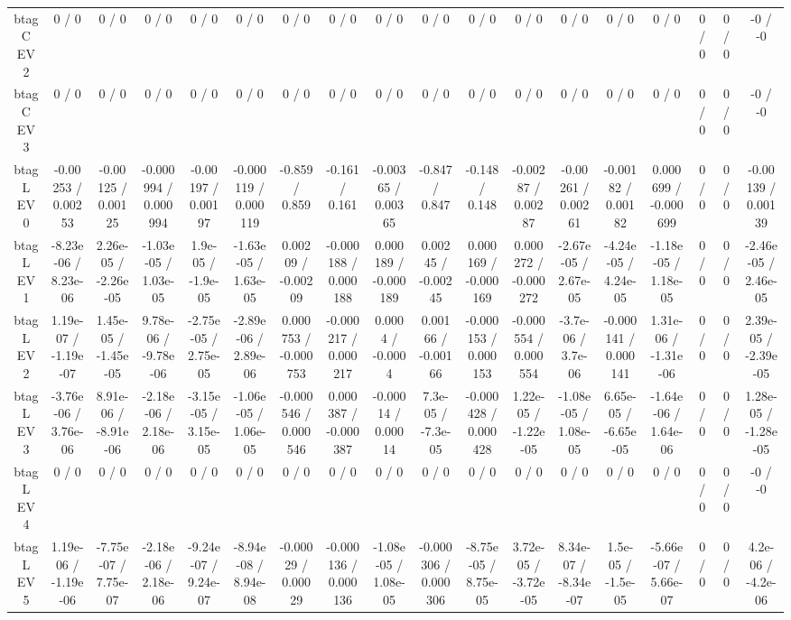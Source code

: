 \documentclass[10pt]{article}
\begin{document}
\begin{table}[htbp]
\begin{center}
\begin{tabular}{|c|c|c|c|c|c|c|c|c|c|c|c|c|c|c|c|c|c|}
  btag C EV 2 & 0 / 0 & 0 / 0 & 0 / 0 & 0 / 0 & 0 / 0 & 0 / 0 & 0 / 0 & 0 / 0 & 0 / 0 & 0 / 0 & 0 / 0 & 0 / 0 & 0 / 0 & 0 / 0 & 0 / 0 & 0 / 0 & -0 / -0 \\ 
  btag C EV 3 & 0 / 0 & 0 / 0 & 0 / 0 & 0 / 0 & 0 / 0 & 0 / 0 & 0 / 0 & 0 / 0 & 0 / 0 & 0 / 0 & 0 / 0 & 0 / 0 & 0 / 0 & 0 / 0 & 0 / 0 & 0 / 0 & -0 / -0 \\ 
  btag L EV 0 & -0.00253 / 0.00253 & -0.00125 / 0.00125 & -0.000994 / 0.000994 & -0.00197 / 0.00197 & -0.000119 / 0.000119 & -0.859 / 0.859 & -0.161 / 0.161 & -0.00365 / 0.00365 & -0.847 / 0.847 & -0.148 / 0.148 & -0.00287 / 0.00287 & -0.00261 / 0.00261 & -0.00182 / 0.00182 & 0.000699 / -0.000699 & 0 / 0 & 0 / 0 & -0.00139 / 0.00139 \\ 
  btag L EV 1 & -8.23e-06 / 8.23e-06 & 2.26e-05 / -2.26e-05 & -1.03e-05 / 1.03e-05 & 1.9e-05 / -1.9e-05 & -1.63e-05 / 1.63e-05 & 0.00209 / -0.00209 & -0.000188 / 0.000188 & 0.000189 / -0.000189 & 0.00245 / -0.00245 & 0.000169 / -0.000169 & 0.000272 / -0.000272 & -2.67e-05 / 2.67e-05 & -4.24e-05 / 4.24e-05 & -1.18e-05 / 1.18e-05 & 0 / 0 & 0 / 0 & -2.46e-05 / 2.46e-05 \\ 
  btag L EV 2 & 1.19e-07 / -1.19e-07 & 1.45e-05 / -1.45e-05 & 9.78e-06 / -9.78e-06 & -2.75e-05 / 2.75e-05 & -2.89e-06 / 2.89e-06 & 0.000753 / -0.000753 & -0.000217 / 0.000217 & 0.0004 / -0.0004 & 0.00166 / -0.00166 & -0.000153 / 0.000153 & -0.000554 / 0.000554 & -3.7e-06 / 3.7e-06 & -0.000141 / 0.000141 & 1.31e-06 / -1.31e-06 & 0 / 0 & 0 / 0 & 2.39e-05 / -2.39e-05 \\ 
  btag L EV 3 & -3.76e-06 / 3.76e-06 & 8.91e-06 / -8.91e-06 & -2.18e-06 / 2.18e-06 & -3.15e-05 / 3.15e-05 & -1.06e-05 / 1.06e-05 & -0.000546 / 0.000546 & 0.000387 / -0.000387 & -0.00014 / 0.00014 & 7.3e-05 / -7.3e-05 & -0.000428 / 0.000428 & 1.22e-05 / -1.22e-05 & -1.08e-05 / 1.08e-05 & 6.65e-05 / -6.65e-05 & -1.64e-06 / 1.64e-06 & 0 / 0 & 0 / 0 & 1.28e-05 / -1.28e-05 \\ 
  btag L EV 4 & 0 / 0 & 0 / 0 & 0 / 0 & 0 / 0 & 0 / 0 & 0 / 0 & 0 / 0 & 0 / 0 & 0 / 0 & 0 / 0 & 0 / 0 & 0 / 0 & 0 / 0 & 0 / 0 & 0 / 0 & 0 / 0 & -0 / -0 \\ 
  btag L EV 5 & 1.19e-06 / -1.19e-06 & -7.75e-07 / 7.75e-07 & -2.18e-06 / 2.18e-06 & -9.24e-07 / 9.24e-07 & -8.94e-08 / 8.94e-08 & -0.00029 / 0.00029 & -0.000136 / 0.000136 & -1.08e-05 / 1.08e-05 & -0.000306 / 0.000306 & -8.75e-05 / 8.75e-05 & 3.72e-05 / -3.72e-05 & 8.34e-07 / -8.34e-07 & 1.5e-05 / -1.5e-05 & -5.66e-07 / 5.66e-07 & 0 / 0 & 0 / 0 & 4.2e-06 / -4.2e-06 \\ 

\end{tabular}
\end{center}
\end{table}
\end{document}
